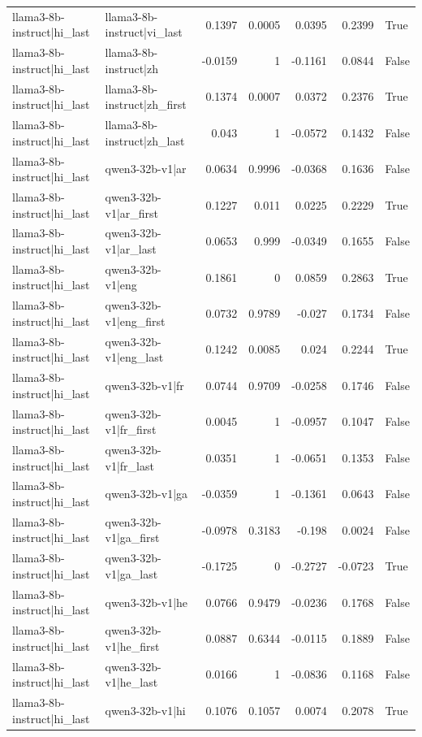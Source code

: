 \begin{table}
\begin{tabular}{l l r r r r l}
llama3-8b-instruct|hi_last & llama3-8b-instruct|vi_last & 0.1397 & 0.0005 & 0.0395 & 0.2399 & True \\
llama3-8b-instruct|hi_last & llama3-8b-instruct|zh & -0.0159 & 1 & -0.1161 & 0.0844 & False \\
llama3-8b-instruct|hi_last & llama3-8b-instruct|zh_first & 0.1374 & 0.0007 & 0.0372 & 0.2376 & True \\
llama3-8b-instruct|hi_last & llama3-8b-instruct|zh_last & 0.043 & 1 & -0.0572 & 0.1432 & False \\
llama3-8b-instruct|hi_last & qwen3-32b-v1|ar & 0.0634 & 0.9996 & -0.0368 & 0.1636 & False \\
llama3-8b-instruct|hi_last & qwen3-32b-v1|ar_first & 0.1227 & 0.011 & 0.0225 & 0.2229 & True \\
llama3-8b-instruct|hi_last & qwen3-32b-v1|ar_last & 0.0653 & 0.999 & -0.0349 & 0.1655 & False \\
llama3-8b-instruct|hi_last & qwen3-32b-v1|eng & 0.1861 & 0 & 0.0859 & 0.2863 & True \\
llama3-8b-instruct|hi_last & qwen3-32b-v1|eng_first & 0.0732 & 0.9789 & -0.027 & 0.1734 & False \\
llama3-8b-instruct|hi_last & qwen3-32b-v1|eng_last & 0.1242 & 0.0085 & 0.024 & 0.2244 & True \\
llama3-8b-instruct|hi_last & qwen3-32b-v1|fr & 0.0744 & 0.9709 & -0.0258 & 0.1746 & False \\
llama3-8b-instruct|hi_last & qwen3-32b-v1|fr_first & 0.0045 & 1 & -0.0957 & 0.1047 & False \\
llama3-8b-instruct|hi_last & qwen3-32b-v1|fr_last & 0.0351 & 1 & -0.0651 & 0.1353 & False \\
llama3-8b-instruct|hi_last & qwen3-32b-v1|ga & -0.0359 & 1 & -0.1361 & 0.0643 & False \\
llama3-8b-instruct|hi_last & qwen3-32b-v1|ga_first & -0.0978 & 0.3183 & -0.198 & 0.0024 & False \\
llama3-8b-instruct|hi_last & qwen3-32b-v1|ga_last & -0.1725 & 0 & -0.2727 & -0.0723 & True \\
llama3-8b-instruct|hi_last & qwen3-32b-v1|he & 0.0766 & 0.9479 & -0.0236 & 0.1768 & False \\
llama3-8b-instruct|hi_last & qwen3-32b-v1|he_first & 0.0887 & 0.6344 & -0.0115 & 0.1889 & False \\
llama3-8b-instruct|hi_last & qwen3-32b-v1|he_last & 0.0166 & 1 & -0.0836 & 0.1168 & False \\
llama3-8b-instruct|hi_last & qwen3-32b-v1|hi & 0.1076 & 0.1057 & 0.0074 & 0.2078 & True \\

\end{tabular}
\end{table}

